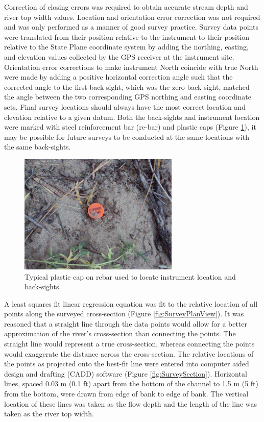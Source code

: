 \begin{linenumbers}
Correction of closing errors was required to obtain accurate stream depth and river top width values.  Location and orientation error correction was not required and was only performed as a manner of good survey practice.  Survey data points were translated from their position relative to the instrument to their position relative to the State Plane coordinate system by adding the northing, easting, and elevation values collected by the GPS receiver at the instrument site.  Orientation error corrections to make instrument North coincide with true North were made by adding a positive horizontal correction angle such that the corrected angle to the first back-sight, which was the zero back-sight, matched the angle between the two corresponding GPS northing and easting coordinate sets.  Final survey locations should always have the most correct location and elevation relative to a given datum.  Both the back-sights and instrument location were marked with steel reinforcement bar (re-bar) and plastic caps (Figure \ref{pic:plasticCap}), it may be possible for future surveys to be conducted at the same locations with the same back-sights.

\begin{figure}[htbp]
\centering
	\includegraphics[width=3in]{Figures/Photo/ControlPoint}
	\caption[Typical plastic cap on rebar used to locate instrument location and back-sights.]{Typical plastic cap on rebar used to locate instrument location and back-sights.}
	\label{pic:plasticCap}
\end{figure}

A least squares fit linear regression equation was fit to the relative location of all points along the surveyed cross-section (Figure \ref{fig:SurveyPlanView}).  It was reasoned that a straight line through the data points would allow for a better approximation of the river's cross-section than connecting the points.  The straight line would represent a true cross-section, whereas connecting the points would exaggerate the distance across the cross-section.  The relative locations of the points as projected onto the best-fit line were entered into computer aided design and drafting (CADD) software (Figure \ref{fig:SurveySection}).  Horizontal lines, spaced 0.03 m (0.1 ft) apart from the bottom of the channel to 1.5 m (5 ft) from the bottom, were drawn from edge of bank to edge of bank.  The vertical location of these lines was taken as the flow depth and the length of the line was taken as the river top width.


\end{linenumbers}
